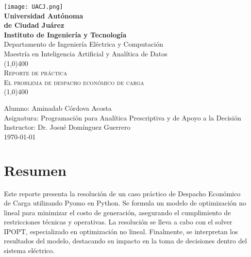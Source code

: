 \documentclass[11pt]{article}
\newcommand{\myTitle}{Reporte de práctica \\ El problema de despacho económico de carga}
\newcommand{\myName}{Alumno: Aminadab Córdova Acosta}
\newcommand{\myClass}{Asignatura: Programación para Analítica Prescriptiva y de Apoyo a la Decisión}
\newcommand{\myTecher}{Instructor: Dr. Josué Domínguez Guerrero}
\newcommand{\myDate}{\today}  %
\begin{document}
\begin{titlepage}
    \begin{center}
        \texttt{[image: UACJ.png]}\\
        \huge{\textbf{Universidad Autónoma\\de Ciudad Juárez}} \\ 
        [0.25in] 
        
        \textbf{\Large{Instituto de Ingeniería y Tecnología}}\\
        \Large{Departamento de Ingeniería Eléctrica y Computación}\\
        \Large{Maestría en Inteligencia Artificial y Analítica de Datos}\\
        [1in]

        \line(1,0){400}\\
        [2mm]
        \textsc{\Large{\myTitle}} \\ 
        \line(1,0){400} \\ 
        [1in]
    \end{center}
    \begin{center}
        \myName \\ 
        \myClass\\ 
        \myTecher\\
        [0.5in]
        \myDate
    \end{center}
\end{titlepage}

\section*{Resumen}
Este reporte presenta la resolución de un caso práctico de Despacho Económico de Carga utilizando Pyomo en Python. Se formula un modelo de optimización no lineal para minimizar el costo de generación, asegurando el cumplimiento de restricciones técnicas y operativas. La resolución se lleva a cabo con el solver IPOPT, especializado en optimización no lineal. Finalmente, se interpretan los resultados del modelo, destacando su impacto en la toma de decisiones dentro del sistema eléctrico.
\cleardoublepage

\tableofcontents
\thispagestyle{empty}
\cleardoublepage

\setcounter{page}{1}   %
\end{document}
